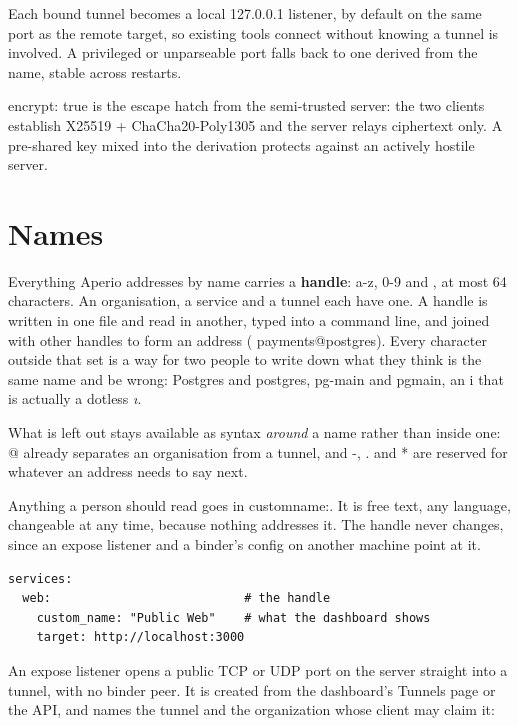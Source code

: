 \documentclass[11pt,a4paper,oneside]{book}
\newcommand{\aperiobreakableunderscore}{\textunderscore\allowbreak}
\newcommand{\aperiocodebreaks}{\XeTeXinterchartokenstate=1 }
\newcommand{\aperiocodebreaks}{}
\DeclareRobustCommand{\code}[1]{{\ttfamily\small\aperiocodebreaks
  \let\_\aperiobreakableunderscore#1}}
\begin{document}
Each bound tunnel becomes a local \code{127.0.0.1} listener, by default on
the same port as the remote target, so existing tools connect without
knowing a tunnel is involved. A privileged or unparseable port falls back to
one derived from the name, stable across restarts.

\code{encrypt: true} is the escape hatch from the semi-trusted server: the
two clients establish X25519 + ChaCha20-Poly1305 and the server relays
ciphertext only. A pre-shared key mixed into the derivation protects
against an actively hostile server.

\section{Names}

Everything Aperio addresses by name carries a \textbf{handle}: \code{a-z},
\code{0-9} and \code{\_}, at most 64 characters. An organisation, a service
and a tunnel each have one. A handle is written in one file and read in
another, typed into a command line, and joined with other handles to form an
address
(\code{payments@postgres}). Every character outside that set is a way for two
people to write down what they think is the same name and be wrong:
\code{Postgres} and \code{postgres}, \code{pg-main} and \code{pg\_main}, an
\code{i} that is actually a dotless \textit{\i}.

What is left out stays available as syntax \emph{around} a name rather than
inside one: \code{@} already separates an organisation from a tunnel, and
\code{-}, \code{.} and \code{*} are reserved for whatever an address needs to
say next.

Anything a person should read goes in \code{custom\_name:}. It is free text,
any language, changeable at any time, because nothing addresses it. The handle
never changes, since an expose listener and a binder's config on another
machine point at it.

\begin{lstlisting}[language=aperioyaml]
services:
  web:                           # the handle
    custom_name: "Public Web"    # what the dashboard shows
    target: http://localhost:3000
\end{lstlisting}

An expose listener opens a public TCP or UDP port on the server straight into
a tunnel, with no binder peer. It is created from the dashboard's Tunnels page
or the API, and names the tunnel and the organization whose client may claim
it:
\end{document}
